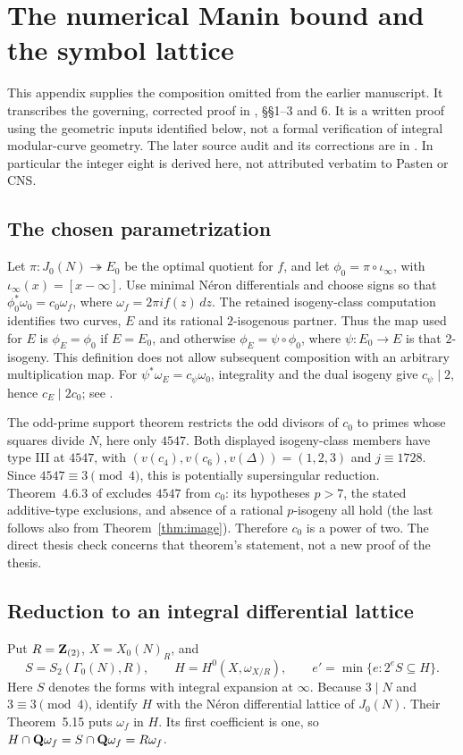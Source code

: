 \section{The numerical Manin bound and the symbol lattice}\label{app:latticeproof}

This appendix supplies the composition omitted from the earlier manuscript. It transcribes the governing, corrected proof in
,
\S\S1--3 and 6. It is a written proof using the geometric inputs identified below, not a formal verification of integral modular-curve geometry. The later source audit and its corrections are in . In particular the integer eight is derived here, not attributed verbatim to Pasten or CNS.

\subsection{The chosen parametrization}
Let $\pi:J_0(N)\twoheadrightarrow E_0$ be the optimal quotient for $f$, and let $\phi_0=\pi\circ\iota_\infty$, with $\iota_\infty(x)=[x-\infty]$. Use minimal N\'eron differentials and choose signs so that
$\phi_0^*\omega_0=c_0\omega_f$, where $\omega_f=2\pi i f(z)\,dz$.
The retained isogeny-class computation identifies two curves, $E$ and its rational $2$-isogenous partner. Thus the map used for $E$ is $\phi_E=\phi_0$ if $E=E_0$, and otherwise $\phi_E=\psi\circ\phi_0$, where $\psi:E_0\to E$ is that $2$-isogeny. This definition does not allow subsequent composition with an arbitrary multiplication map.
For $\psi^*\omega_E=c_\psi\omega_0$, integrality and the dual isogeny give $c_\psi\mid2$, hence $c_E\mid2c_0$; see \cite[proof of Cor.~7.3]{cns}.

The odd-prime support theorem \cite[Cor.~3.7]{arsmanin} restricts the odd divisors of $c_0$ to primes whose squares divide $N$, here only $4547$. Both displayed isogeny-class members have type III at $4547$, with $(v(c_4),v(c_6),v(\Delta))=(1,2,3)$ and $j\equiv1728$. Since $4547\equiv3\pmod4$, this is potentially supersingular reduction. Theorem~4.6.3 of \cite{edixhoventhesis} excludes $4547$ from $c_0$: its hypotheses $p>7$, the stated additive-type exclusions, and absence of a rational $p$-isogeny all hold (the last follows also from Theorem~\ref{thm:image}). Therefore $c_0$ is a power of two. The direct thesis check concerns that theorem's statement, not a new proof of the thesis.

\subsection{Reduction to an integral differential lattice}
Put $R=\mathbf{Z}_{(2)}$, $X=X_0(N)_R$, and
\[
 S=S_2(\Gamma_0(N),R),\qquad H=H^0(X,\omega_{X/R}),\qquad
 e'=\min\{e:2^e S\subseteq H\}.
\]
Here $S$ denotes the forms with integral expansion at $\infty$. Because $3\mid N$ and $3\equiv3\pmod4$, \cite[Thm.~6.12(c), Prop.~6.2]{cns} identify $H$ with the N\'eron differential lattice of $J_0(N)$. Their Theorem~5.15 puts $\omega_f$ in $H$. Its first coefficient is one, so
$H\cap\mathbf{Q}\omega_f=S\cap\mathbf{Q}\omega_f=R\omega_f$.

